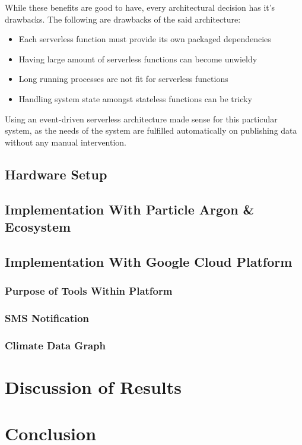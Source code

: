 \documentclass{article}
\begin{document}
While these benefits are good to have, every architectural decision has it's drawbacks. The following  are drawbacks of the said architecture:

\begin{itemize}
	\setlength{\itemindent}{2em}
	\item Each serverless function must provide its own packaged dependencies
	\item Having large amount of serverless functions can become unwieldy
	\item Long running processes are not fit for serverless functions
	\item Handling system state amongst stateless functions can be tricky
\end{itemize}

Using an event-driven serverless architecture made sense for this particular system, as the needs of the system are fulfilled automatically on publishing data without any manual intervention.

\subsection{Hardware Setup}
\subsection{Implementation With Particle Argon \& Ecosystem}
\subsection{Implementation With Google Cloud Platform }
\subsubsection{Purpose of Tools Within Platform}
\subsubsection{SMS Notification}
\subsubsection{Climate Data Graph}




\section{Discussion of Results}

\section{Conclusion}
\end{document}
